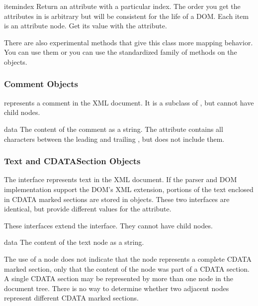 \begin{methoddesc}[NamedNodeMap]{item}{index}
Return an attribute with a particular index.  The order you get the
attributes in is arbitrary but will be consistent for the life of a
DOM.  Each item is an attribute node.  Get its value with the
 attribute.
\end{methoddesc}

There are also experimental methods that give this class more mapping
behavior.  You can use them or you can use the standardized
 family of methods on the 
objects.


\subsubsection{Comment Objects \label{dom-comment-objects}}

 represents a comment in the XML document.  It is a
subclass of , but cannot have child nodes.

\begin{memberdesc}[Comment]{data}
The content of the comment as a string.  The attribute contains all
characters between the leading \code{<!-}\code{-} and trailing
\code{-}\code{->}, but does not include them.
\end{memberdesc}


\subsubsection{Text and CDATASection Objects \label{dom-text-objects}}

The  interface represents text in the XML document.  If
the parser and DOM implementation support the DOM's XML extension,
portions of the text enclosed in CDATA marked sections are stored in
 objects.  These two interfaces are identical, but
provide different values for the  attribute.

These interfaces extend the  interface.  They cannot have
child nodes.

\begin{memberdesc}[Text]{data}
The content of the text node as a string.
\end{memberdesc}

\begin{notice}
  The use of a  node does not indicate that the
  node represents a complete CDATA marked section, only that the
  content of the node was part of a CDATA section.  A single CDATA
  section may be represented by more than one node in the document
  tree.  There is no way to determine whether two adjacent
   nodes represent different CDATA marked
  sections.
\end{notice}


